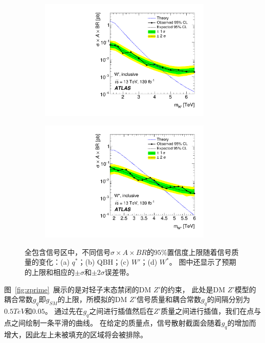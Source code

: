 \begin{figure}[!thbp]
\begin{subfigure}{.5\textwidth}
  \caption{}
  \end{subfigure}
\newline 
  \begin{subfigure}{.5\textwidth}
  \centering
  \includegraphics[width=0.9\textwidth]{figs/fig_04c.pdf}
  \caption{}
  \end{subfigure}
  \begin{subfigure}{.5\textwidth}
  \centering
  \includegraphics[width=0.9\textwidth]{figs/fig_04d.pdf}
  \caption{}
  \end{subfigure}
  \caption{
  全包含信号区中，不同信号$\sigma\times A \times BR$的$95\%$置信度上限随着信号质量的变化：(a) $q^*$；(b) QBH；(c) $W'$；(d) $W^*$。
  图中还显示了预期的上限和相应的$\pm \sigma$和$\pm 2\sigma$误差带。
}
\label{fig:inclusive}
\end{figure}



图~\ref{fig:zprime}~展示的是对轻子末态禁闭的DM $Z'$的约束，
此处是DM $Z'$模型的耦合常数$g_q$即$g_{SM}$的上限，所模拟的DM $Z'$信号质量和耦合常数$g_q$的间隔分别为$0.5TeV$和$0.05$。
通过先在$g_q$之间进行插值然后在$Z'$质量之间进行插值，我们在点与点之间绘制一条平滑的曲线。
在给定的质量点，信号散射截面会随着$g_q$的增加而增大，因此左上未被填充的区域将会被排除。

